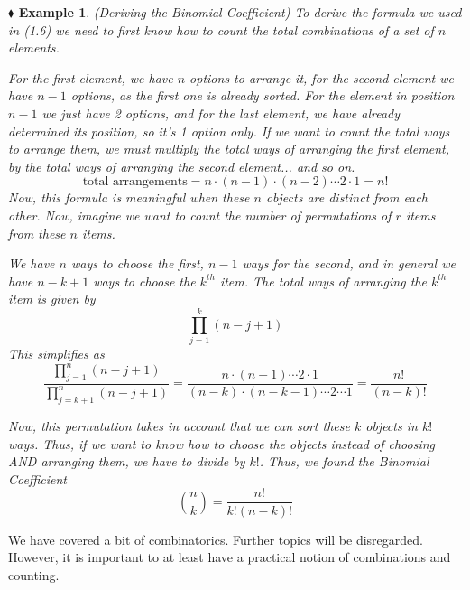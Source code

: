 \documentclass{report}
\newtheorem{example}{$\blacklozenge$ Example}[chapter]
\begin{document}
\begin{example}(Deriving the Binomial Coefficient)
    To derive the formula we used in (1.6) we need to first know how to count the total combinations of a set of 
    $n$ elements. 

    For the first element, we have $n$ options to arrange it, for the second element we have $n-1$ options, as the 
    first one is already sorted. For the element in position $n-1$ we just have 2 options, and for the last element,
    we have already determined its position, so it's 1 option only. If we want to count the total ways to arrange 
    them, we must multiply the total ways of arranging the first element, by the total ways of arranging the second 
    element... and so on. 
    \begin{equation}
        \text{total arrangements} = n\cdot(n-1)\cdot(n-2)\cdots 2 \cdot 1 = n!
    \end{equation}
    Now, this formula is meaningful when these $n$ objects are distinct from each other. Now, imagine we want to count 
    the number of permutations of $r$ items from these $n$ items. 
    
    We have $n$ ways to choose the first, $n-1$ ways for the second, and in general we have $n-k+1$ ways to choose the $k^{th}$
    item. The total ways of arranging the $k^{th}$ item is given by 
    \begin{equation}
        \prod_{j=1}^{k}(n-j+1)
    \end{equation}
    This simplifies as 
    \begin{equation}
        \frac{\prod_{j=1}^{n}{(n-j+1)}}{\prod_{j=k+1}^{n}{(n-j+1)}}=\frac{n\cdot(n-1)\cdots2\cdot1}{(n-k)\cdot(n-k-1)\cdots2\cdots1}=\frac{n!}{(n-k)!}
    \end{equation}
    
    Now, this permutation takes in account that we can sort these $k$ objects in $k!$ ways. Thus, if we want to know how to \textit{choose} the 
    objects instead of choosing AND arranging them, we have to divide by $k!$. Thus, we found the Binomial Coefficient
    \begin{equation}
        \binom{n}{k} = \frac{n!}{k!(n-k)!}
    \end{equation} 
\end{example}

We have covered a bit of combinatorics. Further topics will be disregarded. However, it is important to at least 
have a practical notion of combinations and counting.
\end{document}
